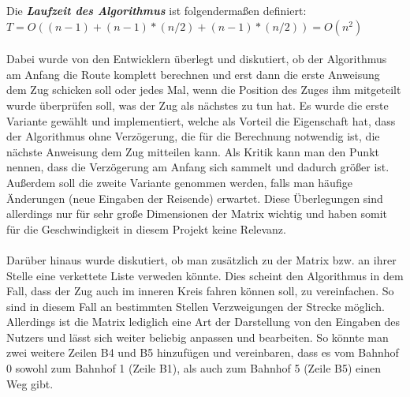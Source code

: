 \noindent
Die \textbf{\textit{Laufzeit des Algorithmus}} ist folgendermaßen definiert:\\
$T = O( (n-1) + (n-1)*(n/2) + (n-1)*(n/2) ) = O(n^2)$\\
\\
Dabei wurde von den Entwicklern überlegt und diskutiert, ob der Algorithmus am Anfang die Route komplett berechnen und erst dann die erste Anweisung dem Zug schicken soll oder jedes Mal, wenn die Position des Zuges ihm mitgeteilt wurde überprüfen soll, was der Zug als nächstes zu tun hat. Es wurde die erste Variante gewählt und implementiert, welche als Vorteil die Eigenschaft hat, dass der Algorithmus ohne Verzögerung, die für die Berechnung notwendig ist, die nächste Anweisung dem Zug mitteilen kann. Als Kritik kann man den Punkt nennen, dass die Verzögerung am Anfang sich sammelt und dadurch größer ist. Außerdem soll die zweite Variante genommen werden, falls man häufige Änderungen (neue Eingaben der Reisende) erwartet. Diese Überlegungen sind allerdings nur für sehr große Dimensionen der Matrix wichtig und haben somit für die Geschwindigkeit in diesem Projekt keine Relevanz.\\
\\
Darüber hinaus wurde diskutiert, ob man zusätzlich zu der Matrix bzw. an ihrer Stelle eine verkettete Liste verweden könnte. Dies scheint den Algorithmus in dem Fall, dass der Zug auch im inneren Kreis fahren können soll, zu vereinfachen. So sind in diesem Fall an bestimmten Stellen Verzweigungen der Strecke möglich. Allerdings ist die Matrix lediglich eine Art der Darstellung von den Eingaben des Nutzers und lässt sich weiter beliebig anpassen und bearbeiten. So könnte man zwei weitere Zeilen B4 und B5 hinzufügen und vereinbaren, dass es vom Bahnhof 0 sowohl zum Bahnhof 1 (Zeile B1), als auch zum Bahnhof 5 (Zeile B5) einen Weg gibt.\\
%
%
